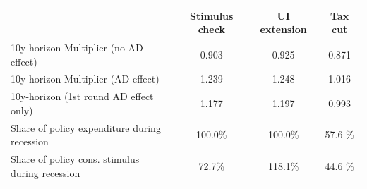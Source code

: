 \begin{tabular}{@{}lccc@{}} 
\toprule 
& Stimulus check    & UI extension    & Tax cut     \\  \midrule 
10y-horizon Multiplier (no AD effect) &0.903  & 0.925  & 0.871     \\ 
10y-horizon Multiplier (AD effect) &1.239  & 1.248  & 1.016     \\ 
10y-horizon (1st round AD effect only) &1.177  & 1.197  & 0.993     \\ 
Share of policy expenditure during recession &100.0\%  & 100.0\%  & 57.6 \%    \\ 
Share of policy cons. stimulus during recession &72.7\%  & 118.1\%  & 44.6 \%    \\ \bottomrule 
\end{tabular}  
